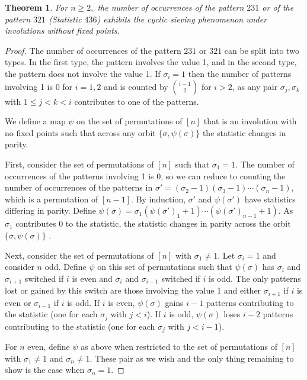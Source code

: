 \documentclass{amsart}
\newtheorem{thm}{Theorem}[section]
\theoremstyle{definition}
\begin{document}
\begin{thm}\label{conj:patterns}
  For $n \geq 2,$ the number of occurrences of the pattern $231$ or of the pattern $321$ (Statistic $436$) exhibits the cyclic sieving phenomenon under involutions without fixed points.\end{thm}

\begin{proof}
  The number of occurrences of the pattern $231$ or $321$ can be split into two types. In the first type, the pattern involves the value 1, and in the second type, the pattern does not involve the value 1. If $\sigma_i = 1$ then the number of patterns involving 1 is $0$ for $i = 1, 2$ and is counted by $\binom{i-1}{2}$ for $i > 2$, as any pair $\sigma_j, \sigma_k$ with $1 \leq j < k < i$ contributes to one of the patterns.

  We define a map $\psi$ on the set of permutations of $[n]$ that is an involution with no fixed points such that across any orbit $\{\sigma, \psi(\sigma)\}$ the statistic changes in parity.

  First, consider the set of permutations of $[n]$ such that $\sigma_1 = 1$. The number of occurrences of the patterns involving 1 is 0, so we can reduce to counting the number of occurrences of the patterns in $\sigma' = (\sigma_2-1)(\sigma_3-1)\dotsm (\sigma_n-1)$, which is a permutation of $[n-1]$.  By induction, $\sigma'$ and $\psi(\sigma')$ have statistics differing in parity. Define $\psi(\sigma) = \sigma_1 (\psi(\sigma')_1 + 1)\dotsm (\psi(\sigma')_{n-1} + 1)$. As $\sigma_1$ contributes 0 to the statistic, the statistic changes in parity across the orbit $\{\sigma, \psi(\sigma)\}$ .

  Next, consider the set of permutations of $[n]$ with $\sigma_1 \neq 1$. Let $\sigma_i = 1$ and consider $n$ odd. Define $\psi$ on this set of permutations such that $\psi(\sigma)$ has $\sigma_i$ and $\sigma_{i+1}$ switched if $i$ is even and $\sigma_{i}$ and $\sigma_{i - 1}$ switched if $i$ is odd. The only patterns lost or gained by this switch are those involving the value 1 and either $\sigma_{i+1}$ if $i$ is even or $\sigma_{i-1}$ if $i$ is odd. If $i$ is even, $\psi(\sigma)$ gains $i - 1$ patterns contributing to the statistic (one for each $\sigma_j$ with $j < i$). If $i$ is odd, $\psi(\sigma)$ loses $i - 2$ patterns contributing to the statistic (one for each $\sigma_j$ with $j < i - 1$).

  For $n$ even, define $\psi$ as above when restricted to the set of permutations of $[n]$ with $\sigma_1 \neq 1$ and $\sigma_n \neq 1$. These pair as we wish and the only thing remaining to show is the case when $\sigma_n = 1$.


\end{proof}
\end{document}
